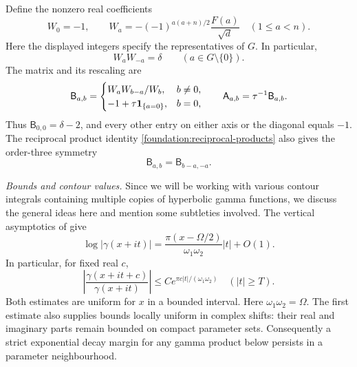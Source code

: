 Define the nonzero real coefficients
\begin{equation}\label{foundation:coefficients}
 W_0=-1,\qquad
 W_a=-(-1)^{a(a+n)/2}\frac{F(a)}{\sqrt d}
 \quad(1\leq a<n).
\end{equation}
Here the displayed integers specify the representatives of $G$.
In particular,
\begin{equation}\label{foundation:reciprocal-products}
 W_aW_{-a}=\delta\qquad(a\in G\setminus\{0\}).
\end{equation}
The matrix and its rescaling are
\begin{equation}\label{foundation:core}
 \mathsf B_{a,b}=
 \begin{cases}
  W_aW_{b-a}/W_b,&b\ne0,\\
  -1+\tau\mathbf1_{\{a=0\}},&b=0,
 \end{cases}
 \qquad \mathsf A_{a,b}=\tau^{-1}\mathsf B_{a,b}.
\end{equation}
Thus $\mathsf B_{0,0}=\delta-2$, and every other entry on either
axis or the diagonal equals $-1$. The reciprocal product identity
\eqref{foundation:reciprocal-products} also gives the order-three symmetry
\begin{equation}\label{foundation:rotation}
 \mathsf B_{a,b}=\mathsf B_{b-a,-a}.
\end{equation}

\emph{Bounds and contour values.} Since we will be working with various contour integrals containing multiple copies of hyperbolic gamma functions, we discuss the general ideas here and mention some subtleties involved.
The vertical asymptotics of \cite[Section~1]{BSS} give
\[
 \log|\gamma(x+it)|
 =\frac{\pi(x-\Omega/2)}{\omega_1\omega_2}|t|+O(1).
\]
In particular, for fixed real $c$,
\[
 \left|\frac{\gamma(x+it+c)}{\gamma(x+it)}\right|
 \leq C e^{\pi c|t|/(\omega_1\omega_2)}
 \quad(|t|\geq T).
\]
Both estimates are uniform for $x$ in a bounded interval.
Here $\omega_1\omega_2=\Omega$. The first estimate
also supplies bounds locally uniform in complex shifts: their real
and imaginary parts remain bounded on compact parameter sets.
Consequently a strict exponential decay margin for any gamma product
below persists in a parameter neighbourhood.

